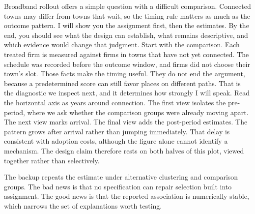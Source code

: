 \documentclass{article}
\newcommand{\scriptopening}[2]{#2}
\newcommand{\scriptframe}[3]{#3}
\newcommand{\ScriptAppendix}{}
\newcommand{\Click}[1]{}
\begin{document}
\scriptopening{0.4 min}{%
  Broadband rollout offers a simple question with a difficult comparison.
  Connected towns may differ from towns that wait, so the timing rule matters
  as much as the outcome pattern. I will show you the assignment first, then
  the estimates. By the end, you should see what the design can establish,
  what remains descriptive, and which evidence would change that judgment.}
\scriptframe{Rollout timing identifies the effect}{0.5 min}{%
  Start with the comparison. Each treated firm is measured against firms in
  towns that have not yet connected. The schedule was recorded before the
  outcome window, and firms did not choose their town's slot. Those facts make
  the timing useful. They do not end the argument, because a predetermined
  score can still favor places on different paths. That is the diagnostic we
  inspect next, and it determines how strongly I will speak.}
\scriptframe{Effects build over three years}{0.6 min}{%
  Read the horizontal axis as years around connection. The first view isolates
  the pre-period, where we ask whether the comparison groups were already
  moving apart. \Click{2} The next view marks arrival. \Click{3} The final view
  adds the post-period estimates. The pattern grows after arrival rather than
  jumping immediately. That delay is consistent with adoption costs, although
  the figure alone cannot identify a mechanism. The design claim therefore
  rests on both halves of this plot, viewed together rather than selectively.}
\ScriptAppendix
\scriptframe{Robustness}{if asked}{%
  The backup repeats the estimate under alternative clustering and comparison
  groups. The bad news is that no specification can repair selection built
  into assignment. The good news is that the reported association is
  numerically stable, which narrows the set of explanations worth testing.}
\end{document}
